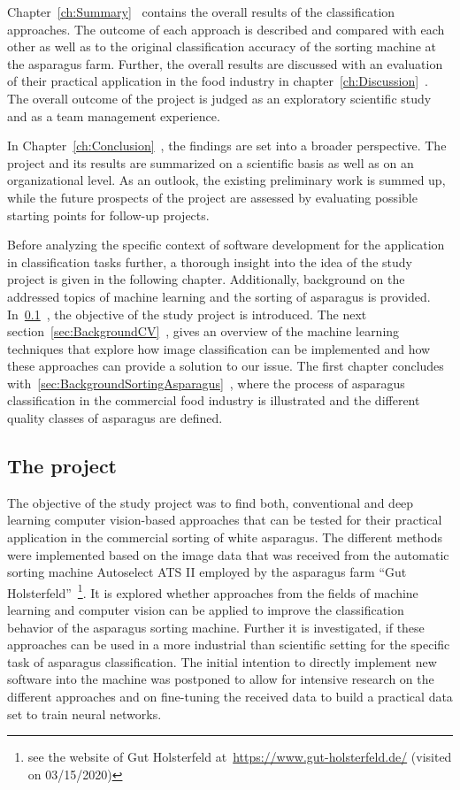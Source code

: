 Chapter~\ref{ch:Summary}~ contains the overall results of the classification approaches. The outcome of each approach is described and compared with each other as well as to the original classification accuracy of the sorting machine at the asparagus farm. Further, the overall results are discussed with an evaluation of their practical application in the food industry in chapter~\ref{ch:Discussion}~. The overall outcome of the project is judged as an exploratory scientific study and as a team management experience.

In Chapter~\ref{ch:Conclusion}~, the findings are set into a broader perspective. The project and its results are summarized on a scientific basis as well as on an organizational level. As an outlook, the existing preliminary work is summed up, while the future prospects of the project are assessed by evaluating possible starting points for follow-up projects.

\bigskip
Before analyzing the specific context of software development for the application in classification tasks further, a thorough insight into the idea of the study project is given in the following chapter. Additionally, background on the addressed topics of machine learning and the sorting of asparagus is provided.
In~\ref{sec:Project}~, the objective of the study project is introduced. The next section~\ref{sec:BackgroundCV}~, gives an overview of the machine learning techniques that explore how image classification can be implemented and how these approaches can provide a solution to our issue. The first chapter concludes with~\ref{sec:BackgroundSortingAsparagus}~, where the process of asparagus classification in the commercial food industry is illustrated and the different quality classes of asparagus are defined.


\subsection{The project}
\label{sec:Project}

The objective of the study project was to find both, conventional and deep learning computer vision-based approaches that can be tested for their practical application in the commercial sorting of white asparagus. The different methods were implemented based on the image data that was received from the automatic sorting machine Autoselect ATS II employed by the asparagus farm \enquote{Gut Holsterfeld}~\footnote{see the website of Gut Holsterfeld at~\url{https://www.gut-holsterfeld.de/} (visited on 03/15/2020)}. It is explored whether approaches from the fields of machine learning and computer vision can be applied to improve the classification behavior of the asparagus sorting machine. Further it is investigated, if these approaches can be used in a more industrial than scientific setting for the specific task of asparagus classification. The initial intention to directly implement new software into the machine was postponed to allow for intensive research on the different approaches and on fine-tuning the received data to build a practical data set to train neural networks.

